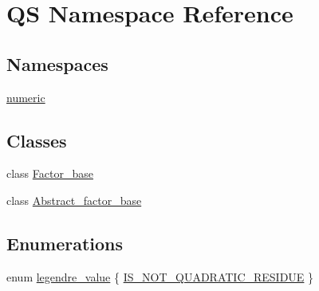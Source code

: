 \hypertarget{namespaceQS}{\section{Q\-S Namespace Reference}
\label{namespaceQS}
}
\subsection*{Namespaces}
\begin{DoxyCompactItemize}
\item 
\hyperlink{namespaceQS_1_1numeric}{numeric}
\end{DoxyCompactItemize}
\subsection*{Classes}
\begin{DoxyCompactItemize}
\item 
class \hyperlink{classQS_1_1Factor__base}{Factor\-\_\-base}
\item 
class \hyperlink{classQS_1_1Abstract__factor__base}{Abstract\-\_\-factor\-\_\-base}
\end{DoxyCompactItemize}
\subsection*{Enumerations}
\begin{DoxyCompactItemize}
\item 
enum \hyperlink{namespaceQS_a024d1d769604dfe6754960df275f87c5}{legendre\-\_\-value} \{ \hyperlink{namespaceQS_a024d1d769604dfe6754960df275f87c5a2dbd3ee2718c9e8cb4b8fbb27331b354}{I\-S\-\_\-\-N\-O\-T\-\_\-\-Q\-U\-A\-D\-R\-A\-T\-I\-C\-\_\-\-R\-E\-S\-I\-D\-U\-E}
 \}
\end{DoxyCompactItemize}


